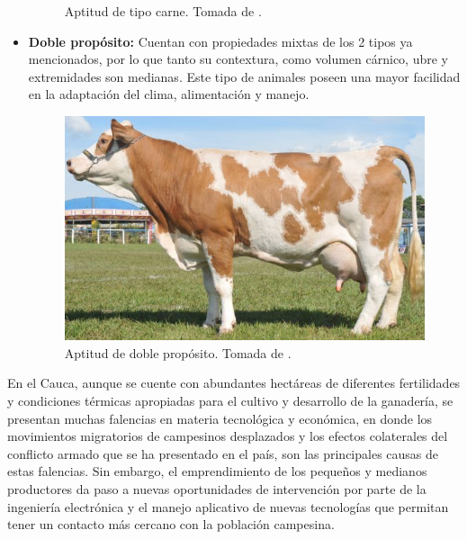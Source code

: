 \begin{itemize}
\begin{figure}[H]
\begin{center}
 \end{center}
 \caption{Aptitud de tipo carne. Tomada de \cite{googlepics}. }
\end{figure}
\item \textbf{Doble propósito:} Cuentan con propiedades mixtas de los 2 tipos ya mencionados, por lo que tanto su contextura, como volumen cárnico, ubre y extremidades son medianas. Este tipo de animales poseen una mayor facilidad en la adaptación del clima, alimentación y manejo. 
\begin{figure}[H]
 \begin{center}
 \includegraphics[scale=0.8]{img/dibujito4.png}
 \end{center}
 \caption{Aptitud de doble propósito.  Tomada de \cite{googlepics}. \label{}}
\end{figure}
\end{itemize}



En el Cauca, aunque se cuente con abundantes hectáreas de diferentes fertilidades y condiciones térmicas apropiadas para el cultivo y desarrollo de la ganadería, se presentan muchas falencias en materia tecnológica y económica, en donde los movimientos migratorios de campesinos desplazados y los efectos colaterales del conflicto armado que se ha presentado en el país, son las principales causas de estas falencias. Sin embargo, el emprendimiento de los pequeños y medianos productores da paso a nuevas oportunidades de intervención por parte de la ingeniería electrónica y el manejo aplicativo de nuevas tecnologías que permitan tener un contacto más cercano con la población campesina.\\



